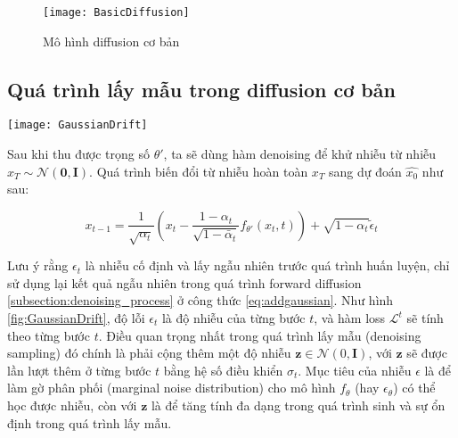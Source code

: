 	\begin{figure}
		\centering
		\texttt{[image: BasicDiffusion]}
		\caption{Mô hình diffusion cơ bản}
		\label{fig:basic_diffusion}
	\end{figure}
	
	\subsection{Quá trình lấy mẫu trong diffusion cơ bản}
	
		\begin{figure*}
		\centering
		\texttt{[image: GaussianDrift]}
		\caption{Quá trình Training và Sampling trong mô hình Diffusion tiêu chuẩn}
		\label{fig:GaussianDrift}
	\end{figure*}
	

	Sau khi thu được trọng số $\theta'$, ta sẽ dùng hàm denoising để khử nhiễu từ nhiễu $x_T \sim \mathcal{N} (\mathbf{0}, \mathbf{I})$.
	Quá trình biến đổi từ nhiễu hoàn toàn $x_{T}$ sang dự đoán $\hat{x_0}$ như sau:
	
	\begin{equation}
		\label{eq:adddenoising}
		x_{t-1} = \frac{1}{\sqrt{\alpha_t}} \left( x_t - \frac{1- \alpha_t}{\sqrt{1 - \bar{\alpha}_t}} f_{\theta'}(x_t, t) \right) + \sqrt{1 - \alpha_t} \tilde{\epsilon}_t
	\end{equation}
	
Lưu ý rằng $\epsilon_t$ là nhiễu cố định và lấy ngẫu nhiên trước quá trình huấn luyện, chỉ sử dụng lại kết quả ngẫu nhiên trong quá trình forward diffusion \ref{subsection:denoising_process} ở công thức  \ref{eq:addgaussian}. Như hình \ref{fig:GaussianDrift}, độ lỗi $\epsilon_t$ là độ nhiễu của từng bước $t$, và hàm loss  $\mathcal{L}^{t}$ sẽ tính theo từng bước $t$. Điều quan trọng nhất trong quá trình lấy mẫu (denoising sampling) đó chính là phải cộng thêm một độ nhiễu $\mathbf{z} \in \mathcal{N}(0, \mathbf{I})$, với $\mathbf{z}$  sẽ được lần lượt thêm ở từng bước $t$ bằng hệ số điều khiển $\sigma_t$. Mục tiêu của nhiễu $\epsilon$ là để  làm gờ phân phối (marginal noise distribution) cho mô hình $f_\theta$ (hay $\epsilon_{\theta}$) có thể học được nhiễu, còn với  $\mathbf{z}$ là để tăng tính đa dạng trong quá trình sinh và sự ổn định trong quá trình lấy mẫu.
	



